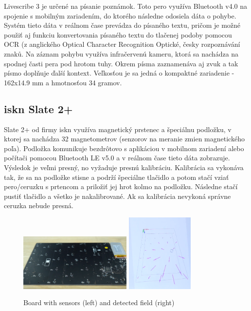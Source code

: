 Livescribe 3 je určené na písanie poznámok. Toto pero využíva Bluetooth v4.0 na spojenie s mobilným zariadením, do ktorého následne odosiela dáta o pohybe. Systém tieto dáta v reálnom čase prevádza do písaného textu, pričom je možné použiť aj funkciu konvertovania písaného textu do tlačenej podoby pomocou OCR (z anglického Optical Character Recognition Optické, česky rozpoznávání znaků. Na záznam pohybu využíva infračervenú kameru, ktorá sa nachádza na spodnej časti pera pod hrotom tuhy. Okrem písma zaznamenáva aj zvuk a tak písmo doplňuje ďalší kontext. Veľkosťou je sa jedná o kompaktné zariadenie - 162x14.9 mm a hmotnosťou 34 gramov.\newline

\subsection*{iskn Slate 2+}

Slate 2+ od firmy iskn využíva magnetický prstenec a špeciálnu podložku, v ktorej sa nachádza 32 magnetometrov (senzorov na meranie zmien magnetického poľa). Podložka komunikuje bezdrôtovo s aplikáciou v mobilnom zariadení alebo počítači pomocou Bluetooth LE v5.0 a v reálnom čase tieto dáta zobrazuje. Výsledok je veľmi presný, no vyžaduje presnú kalibráciu. Kalibrácia sa vykonáva tak, že sa na podložke stisne a podrží špeciálne tlačidlo a potom stačí vziať pero/ceruzku s prtencom a priložiť jej hrot kolmo na podložku. Následne stačí pustiť tlačidlo a všetko je nakalibrované. Ak sa kalibrácia nevykoná správne ceruzka nebude presná.\newline

\begin{figure}[hbt]
	\centering
	\includegraphics[width=0.5\textwidth]{obrazky-figures/isknBoard.png}
	\includegraphics[width=0.3\textwidth]{obrazky-figures/isknMagneticfield.png}
	\caption{Board with sensors (left) and detected field (right)}
	\label{ISKN}
\end{figure}

